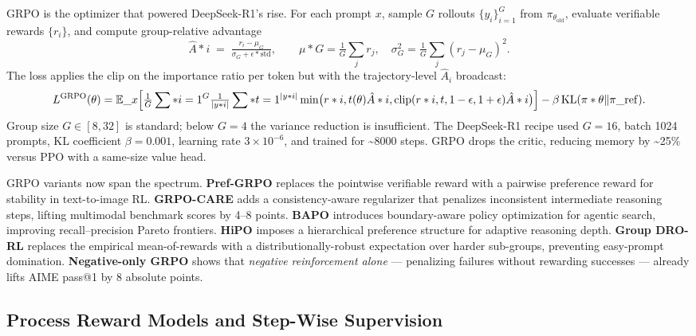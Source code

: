 \documentclass{article}
\begin{document}
GRPO \citep{shao20242024} is the optimizer that powered DeepSeek-R1's rise. For each prompt \(x\), sample \(G\) rollouts \(\{y_i\}_{i=1}^{G}\) from \(\pi_{\theta_{\mathrm{old}}}\), evaluate verifiable rewards \(\{r_i\}\), and compute group-relative advantage
\[\hat A*i \;=\; \tfrac{r_i - \mu_G}{\sigma_G + \epsilon*{\mathrm{std}}}, \qquad \mu*G = \tfrac{1}{G}\sum_j r_j, \quad \sigma_G^2 = \tfrac{1}{G}\sum_j (r_j-\mu_G)^2.\]
The loss applies the clip on the importance ratio per token but with the trajectory-level \(\hat A_i\) broadcast:
\[L^{\mathrm{GRPO}}(\theta) = \mathbb{E}\_x\Bigl[ \tfrac{1}{G}\sum*{i=1}^{G} \tfrac{1}{|y*i|}\sum*{t=1}^{|y*i|} \min\bigl(r*{i,t}(\theta)\hat A*i, \mathrm{clip}(r*{i,t}, 1-\epsilon,1+\epsilon)\hat A*i\bigr) \Bigr] - \beta \,\mathrm{KL}(\pi*\theta \| \pi\_{\mathrm{ref}}).\]
Group size \(G \in [8, 32]\) is standard; below \(G=4\) the variance reduction is insufficient. The DeepSeek-R1 recipe used \(G = 16\), batch 1024 prompts, KL coefficient \(\beta = 0.001\), learning rate \(3 \times 10^{-6}\), and trained for \textasciitilde8000 steps. GRPO drops the critic, reducing memory by \textasciitilde25\% versus PPO with a same-size value head.

GRPO variants now span the spectrum. \textbf{Pref-GRPO} \citep{wang20252025} replaces the pointwise verifiable reward with a pairwise preference reward for stability in text-to-image RL. \textbf{GRPO-CARE} \citep{chen20252025} adds a consistency-aware regularizer that penalizes inconsistent intermediate reasoning steps, lifting multimodal benchmark scores by 4--8 points. \textbf{BAPO} \citep{liu20262026} introduces boundary-aware policy optimization for agentic search, improving recall--precision Pareto frontiers. \textbf{HiPO} \citep{kachroo20262026} imposes a hierarchical preference structure for adaptive reasoning depth. \textbf{Group DRO-RL} \citep{panaganti20262026} replaces the empirical mean-of-rewards with a distributionally-robust expectation over harder sub-groups, preventing easy-prompt domination. \textbf{Negative-only GRPO} \citep{zhu20252025} shows that \emph{negative reinforcement alone} --- penalizing failures without rewarding successes --- already lifts AIME pass@1 by 8 absolute points.

\subsection{Process Reward Models and Step-Wise Supervision}\label{process-reward-models-and-step-wise-supervision}
\end{document}
